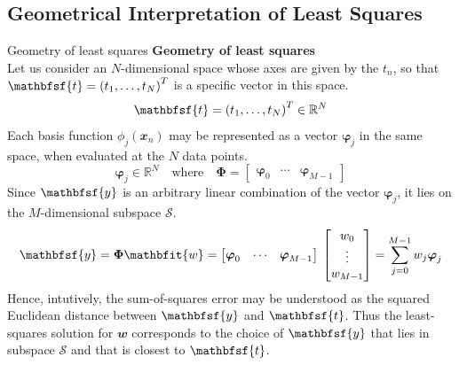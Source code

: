 \documentclass{bredelebeamer}
\begin{document}
\subsection{Geometrical Interpretation of Least Squares}
\begin{frame}{Geometry of least squares}
  \textbf{Geometry of least squares}\\
  Let us consider an $N$-dimensional space whose axes are given by the $t_n$,
  so that $\mathbfsf{t} = {(t_1,\ldots,t_N)}^T$ is a specific vector in this space.
  \begin{equation}
    \mathbfsf{t} = {(t_1,\ldots,t_N)}^T \in \mathbb{R}^N
  \end{equation}
  Each basis function $\phi_j (\mathbfit{x}_n)$ may be represented as a vector
  $\boldsymbol{\varphi}_j$ in the same space, when evaluated at the $N$ data points.
  \begin{equation}
    \boldsymbol{\varphi}_j \in \mathbb{R}^N
    \quad \textrm{where} \quad \boldsymbol{\Phi} =
    \begin{bmatrix}
      \boldsymbol{\varphi}_0 & \cdots & \boldsymbol{\varphi}_{M-1}
    \end{bmatrix}
  \end{equation}
  Since $\mathbfsf{y}$ is an arbitrary linear combination of the vector
  $\boldsymbol{\varphi}_j$, it lies on the $M$-dimensional subspace $\mathcal{S}$.
  \begin{equation}
    \mathbfsf{y} = \boldsymbol{\Phi}\mathbfit{w} =
    \begin{bmatrix}
      \boldsymbol{\varphi}_0 & \cdots & \boldsymbol{\varphi}_{M-1}
    \end{bmatrix}
    \:
    \begin{bmatrix}
      w_0 \\ \vdots \\ w_{M-1}
    \end{bmatrix}
    =
    \sum_{j=0}^{M-1} w_j \boldsymbol{\varphi}_j
  \end{equation}
  Hence, intutively, the sum-of-squares error may be understood as the squared
  Euclidean distance between $\mathbfsf{y}$ and $\mathbfsf{t}$. Thus the least-squares
  solution for $\mathbfit{w}$ corresponds to the choice of $\mathbfsf{y}$ that
  lies in subspace $\mathcal{S}$ and that is closest to $\mathbfsf{t}$.
\end{frame}
\end{document}
